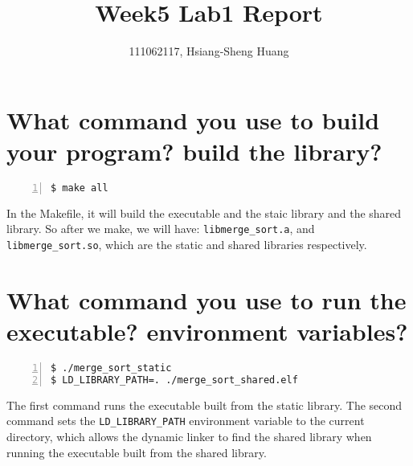 \documentclass{article}
\title{Week5 Lab1 Report}
\author{111062117, Hsiang-Sheng Huang}
\begin{document}
\maketitle

\section*{What command you use to build your program? build the library?}
\begin{lstlisting}[language=bash, basicstyle=\ttfamily\small, numbers=left, numberstyle=\tiny\color{gray}, stepnumber=1, frame=single]
$ make all
\end{lstlisting}

In the Makefile, it will build the executable and the staic library and the shared library. So after we make, we will have: \texttt{libmerge\_sort.a}, and \texttt{libmerge\_sort.so}, which are the static and shared libraries respectively.

\section*{What command you use to run the executable? environment variables?}
\begin{lstlisting}[language=bash, basicstyle=\ttfamily\small, numbers=left, numberstyle=\tiny\color{gray}, stepnumber=1, frame=single]
$ ./merge_sort_static
$ LD_LIBRARY_PATH=. ./merge_sort_shared.elf
\end{lstlisting}

The first command runs the executable built from the static library. The second command sets the \texttt{LD\_LIBRARY\_PATH} environment variable to the current directory, which allows the dynamic linker to find the shared library when running the executable built from the shared library.
\end{document}
